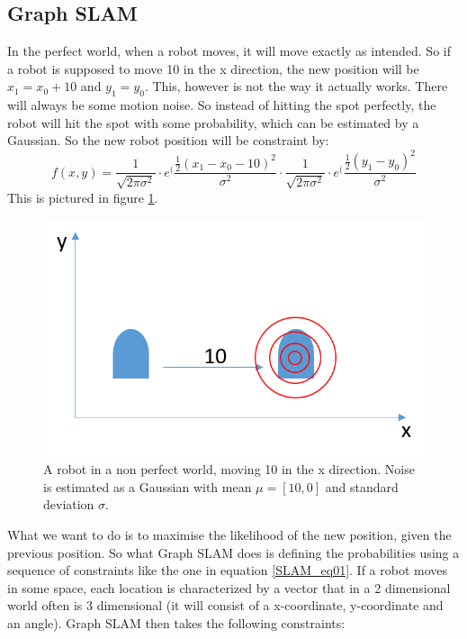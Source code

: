 \subsection{Graph SLAM}
In the perfect world, when a robot moves, it will move exactly as intended. So if a robot is supposed to move 10 in the x direction, the new position will be $x_1 = x_0 + 10$ and $y_1 = y_0$. 
This, however is not the way it actually works. There will always be some motion noise. So instead of hitting the spot perfectly, the robot will hit the spot with some probability, which can be estimated by a Gaussian. So the new robot position will be constraint by:
\begin{equation}
f(x,y)=\frac{1}{\sqrt{2\pi\sigma^2}} \cdot e^(\frac{\frac{1}{2}(x_1-x_0-10)^2}{\sigma^2} \cdot \frac{1}{\sqrt{2\pi\sigma^2}} \cdot e^(\frac{\frac{1}{2}(y_1-y_0)^2}{\sigma^2}
\label{SLAM_eq01}
\end{equation}
This is pictured in figure \ref{SLAM_fig02}.
\begin{figure}[h!]
	\centering
    \includegraphics[scale=0.5]{billeder/GraphSLAM02.png}
    \caption{A robot in a non perfect world, moving 10 in the x direction. Noise is estimated as a Gaussian with mean $\mu = [10,0]$ and standard deviation $\sigma$.}
    \label{SLAM_fig02}
\end{figure}
What we want to do is to maximise the likelihood of the new position, given the previous position.
So what Graph SLAM does is defining the probabilities using a sequence of constraints like the one in equation \ref{SLAM_eq01}. 
If a robot moves in some space, each location is characterized by a vector that in a 2 dimensional world often is 3 dimensional (it will consist of a x-coordinate, y-coordinate and an angle). 
Graph SLAM then takes the following constraints: 
